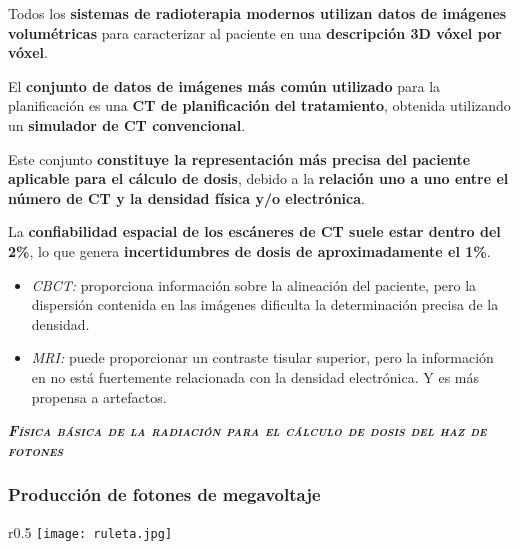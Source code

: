 \documentclass[aspectratio=169,xcolor=dvipsnames,t]{beamer}
\begin{document}
\begin{frame}

    Todos los \textbf{sistemas de radioterapia modernos utilizan datos de imágenes volumétricas} para caracterizar al paciente en una \textbf{descripción 3D vóxel por vóxel}.
    
    El \textbf{conjunto de datos de imágenes más común utilizado} para la planificación es una \textbf{CT de planificación del tratamiento}, obtenida utilizando un \textbf{simulador de CT convencional}.

    Este conjunto \textbf{constituye la representación más precisa del paciente aplicable para el cálculo de dosis}, debido a la \textbf{relación uno a uno entre el número de CT y la densidad física y/o electrónica}.

    La \textbf{confiabilidad espacial de los escáneres de CT suele estar dentro del 2\%}, lo que genera \textbf{incertidumbres de dosis de aproximadamente el 1\%}.

    \begin{itemize}
        \item \textit{CBCT:} proporciona información sobre la alineación del paciente, pero la dispersión contenida en las imágenes dificulta la determinación precisa de la densidad.
        \item  \textit{MRI:} puede proporcionar un contraste tisular superior, pero la información en no está fuertemente relacionada con la densidad electrónica. Y es más propensa a artefactos.
    \end{itemize}

\end{frame}



\begin{frame}[standout]
    \centering\LARGE
    \textbf{\itshape\scshape Física básica de la radiación para el cálculo de dosis del haz de fotones}
\end{frame}

\begin{frame}

      \frametitle{Producción de fotones de megavoltaje}

      \begin{wrapfigure}{r}{0.5\textwidth}
            \centering
            \texttt{[image: ruleta.jpg]}
      \end{wrapfigure}

\end{frame}
\end{document}
